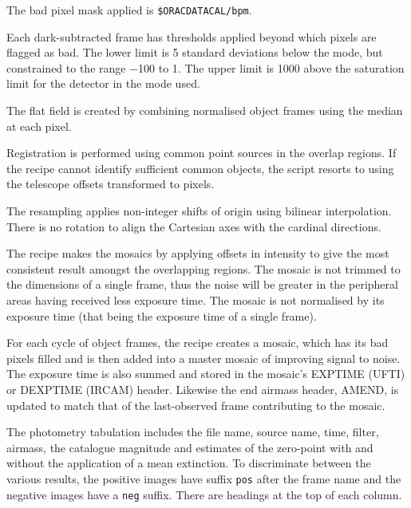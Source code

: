 \documentclass[twoside,11pt]{article}
\renewcommand{\_}{\texttt{\symbol{95}}}
\newcommand{\sstitem}{\item}
\begin{document}
{{{         \sstitem
         The bad pixel mask applied is {\tt\$ORAC\_DATA\_CAL/bpm}.

         \sstitem
         Each dark-subtracted frame has thresholds applied beyond which
         pixels are flagged as bad.  The lower limit is 5 standard
         deviations below the mode, but constrained to the range $-$100 to 1.
         The upper limit is 1000 above the saturation limit for the detector
         in the mode used.

         \sstitem
         The flat field is created by combining normalised object
         frames using the median at each pixel.

         \sstitem
         Registration is performed using common point sources in the
         overlap regions.  If the recipe cannot identify sufficient common
         objects, the script resorts to using the telescope offsets
         transformed to pixels.

         \sstitem
         The resampling applies non-integer shifts of origin using
         bilinear interpolation.  There is no rotation to align the
         Cartesian axes with the cardinal directions.

         \sstitem
         The recipe makes the mosaics by applying offsets in intensity
         to give the most consistent result amongst the overlapping regions.
         The mosaic is not trimmed to the dimensions of a single frame, thus
         the noise will be greater in the peripheral areas having received
         less exposure time.  The mosaic is not normalised by its exposure
         time (that being the exposure time of a single frame).

         \sstitem
         For each cycle of object frames, the recipe creates a mosaic,
         which has its bad pixels filled and is then added into a master
         mosaic of improving signal to noise.  The exposure time is also
         summed and stored in the mosaic's EXP\_TIME (UFTI) or DEXPTIME
         (IRCAM) header.  Likewise the end airmass header, AMEND, is updated
         to match that of the last-observed frame contributing to the mosaic.

         \sstitem
         The photometry tabulation includes the file name, source
         name, time, filter, airmass, the catalogue magnitude and
         estimates of the zero-point with and without the application
         of a mean extinction.  To discriminate between the various
         results, the positive images have suffix {\tt \_pos} after the
         frame name and the negative images have a {\tt \_neg} suffix.
         There are headings at the top of each column.

}}}
\end{document}
